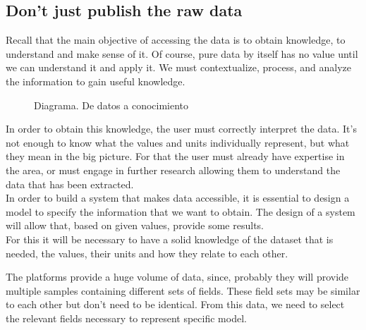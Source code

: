 \subsection{Don't just publish the raw data}

Recall that the main objective of accessing the data is to obtain knowledge, to understand and make sense of it. Of course, 
pure data by itself has no value until we can understand it and apply it. We must contextualize, process, and analyze the 
information to gain useful knowledge. \\ 
    
\begin{figure}[ht]
    \centering 
    \caption{Diagrama. De datos a conocimiento}
\end{figure}
 
In order to obtain this knowledge, the user must correctly interpret the data. It's not enough to know what the values and 
units individually represent, but what they mean in the big picture. For that the user must already have expertise in the 
area, or must engage in further research allowing them to understand the data that has been extracted.\\
    
In order to build a system that makes data accessible, it is essential to design a model to specify the
information that we want to obtain. The design of a system will allow that, based on given values, provide some results.\\

For this it will be necessary to have a solid knowledge of the dataset that is needed, the values, their units and how they relate to each other.

The platforms provide a huge volume of data, since, probably they will provide multiple samples containing different sets of fields. 
These field sets may be similar to each other but don't need to be identical.
From this data, we need to select the relevant fields necessary to represent specific model.\\


